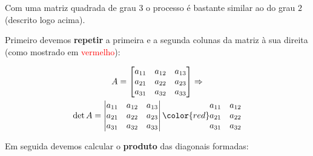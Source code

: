 Com uma matriz quadrada de grau 3 o processo é bastante similar ao do grau $2$ (descrito logo acima). 

Primeiro devemos \textbf{repetir} a primeira e a segunda colunas da matriz à sua direita (como mostrado em \textcolor{red}{vermelho}):

\begin{gather*}
    A=\begin{bmatrix*}[r]
        a_{11} & a_{12} & a_{13} \\
        a_{21} & a_{22} & a_{23} \\
        a_{31} & a_{32} & a_{33}
    \end{bmatrix*} \Rightarrow \\
    \det A= \begin{vmatrix*}[r]
        a_{11} & a_{12} & a_{13} \\
        a_{21} & a_{22} & a_{23} \\
        a_{31} & a_{32} & a_{33}
    \end{vmatrix*} \color{red} \begin{matrix}
        a_{11} & a_{12} \\
        a_{21} & a_{22} \\
        a_{31} & a_{32}
    \end{matrix}
\end{gather*}

Em seguida devemos calcular o \textbf{produto} das diagonais formadas:


